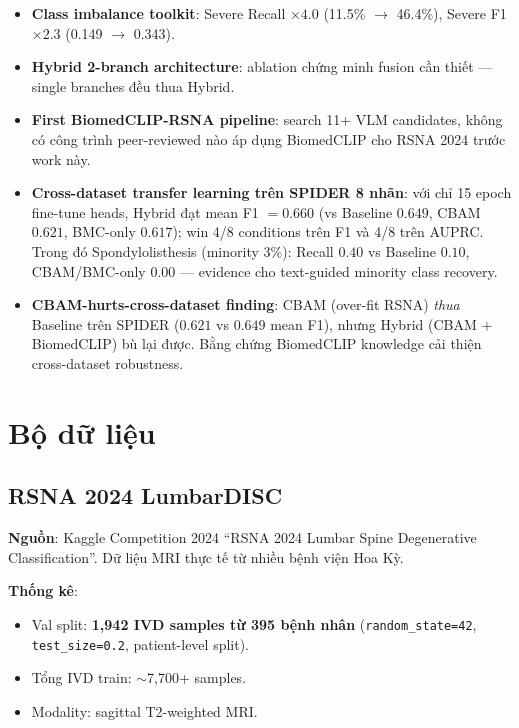 \documentclass[11pt,a4paper]{article}
\begin{document}
\begin{itemize}[leftmargin=*]
\item \textbf{Class imbalance toolkit}: Severe Recall $\times 4.0$
(11.5\% $\to$ 46.4\%), Severe F1 $\times 2.3$ (0.149 $\to$ 0.343).
\item \textbf{Hybrid 2-branch architecture}: ablation chứng minh
fusion cần thiết --- single branches đều thua Hybrid.
\item \textbf{First BiomedCLIP-RSNA pipeline}: search 11+ VLM
candidates, không có công trình peer-reviewed nào áp dụng BiomedCLIP
cho RSNA 2024 trước work này.
\item \textbf{Cross-dataset transfer learning trên SPIDER 8 nhãn}: với
chỉ 15 epoch fine-tune heads, Hybrid đạt mean F1 $=0.660$ (vs Baseline
$0.649$, CBAM $0.621$, BMC-only $0.617$); win 4/8 conditions trên F1
và 4/8 trên AUPRC. Trong đó Spondylolisthesis (minority $3\%$): Recall
$0.40$ vs Baseline $0.10$, CBAM/BMC-only $0.00$ --- evidence cho
text-guided minority class recovery.
\item \textbf{CBAM-hurts-cross-dataset finding}: CBAM (over-fit RSNA)
\emph{thua} Baseline trên SPIDER ($0.621$ vs $0.649$ mean F1), nhưng
Hybrid (CBAM $+$ BiomedCLIP) bù lại được. Bằng chứng BiomedCLIP knowledge
cải thiện cross-dataset robustness.
\end{itemize}

\section{Bộ dữ liệu}

\subsection{RSNA 2024 LumbarDISC}

\noindent\textbf{Nguồn}: Kaggle Competition 2024 ``RSNA 2024 Lumbar Spine
Degenerative Classification''. Dữ liệu MRI thực tế từ nhiều bệnh viện
Hoa Kỳ.

\noindent\textbf{Thống kê}:
\begin{itemize}[leftmargin=*]
\item Val split: \textbf{1,942 IVD samples từ 395 bệnh nhân}
(\verb|random_state=42|, \verb|test_size=0.2|, patient-level split).
\item Tổng IVD train: $\sim$7,700+ samples.
\item Modality: sagittal T2-weighted MRI.
\end{itemize}
\end{document}
